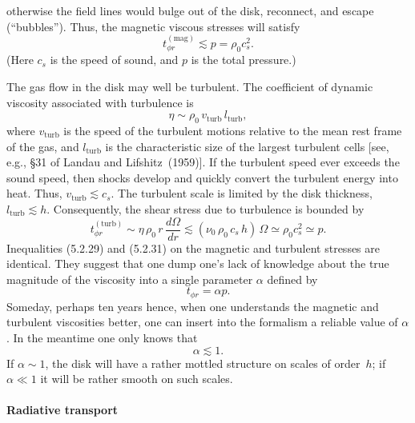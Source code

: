 otherwise the field lines would bulge out of the disk, reconnect, and escape
(``bubbles''). Thus, the magnetic viscous stresses will satisfy
\begin{equation}
t_{\phi r}^{(\text{mag})} \lesssim p = \rho_0 c_s^2.
\tag{5.2.29}
\end{equation}
(Here $c_s$ is the speed of sound, and $p$ is the total pressure.)

The gas flow in the disk may well be turbulent. The coefficient of dynamic
viscosity associated with turbulence is
\begin{equation}
\eta \sim \rho_0\, v_{\text{turb}}\, l_{\text{turb}},
\tag{5.2.30}
\end{equation}
where $v_{\text{turb}}$ is the speed of the turbulent motions relative to the mean rest
frame of the gas, and $l_{\text{turb}}$ is the characteristic size of the largest turbulent cells
[see, e.g., \S31 of Landau and Lifshitz~(1959)\cite{LandauLifshitz1959}].
If the turbulent speed ever exceeds
the sound speed, then shocks develop and quickly convert the turbulent energy
into heat. Thus, $v_{\text{turb}} \lesssim c_s$. The turbulent scale is limited by the disk thickness,
$l_{\text{turb}} \lesssim h$. Consequently, the shear stress due to turbulence is bounded by
\begin{equation}
t_{\phi r}^{(\text{turb})} \sim \eta\,\rho_0\,r\,\frac{d\Omega}{dr}
\lesssim (\nu_0\,\rho_0\,c_s\,h)\,\Omega
\simeq \rho_0 c_s^2 \simeq p.
\tag{5.2.31}
\end{equation}
Inequalities (5.2.29) and (5.2.31) on the magnetic and turbulent stresses are
identical. They suggest that one dump one's lack of knowledge about the true
magnitude of the viscosity into a single parameter $\alpha$ defined by
\begin{equation}
t_{\phi r} = \alpha p.
\tag{5.2.32}
\end{equation}
Someday, perhaps ten years hence, when one understands the magnetic and
turbulent viscosities better, one can insert into the formalism a reliable value of
$\alpha$. In the meantime one only knows that
\begin{equation}
\alpha \lesssim 1.
\tag{5.2.33}
\end{equation}
If $\alpha \sim 1$, the disk will have a rather mottled structure on scales of order~$h$; if
$\alpha \ll 1$ it will be rather smooth on such scales.

\paragraph*{Radiative transport}

